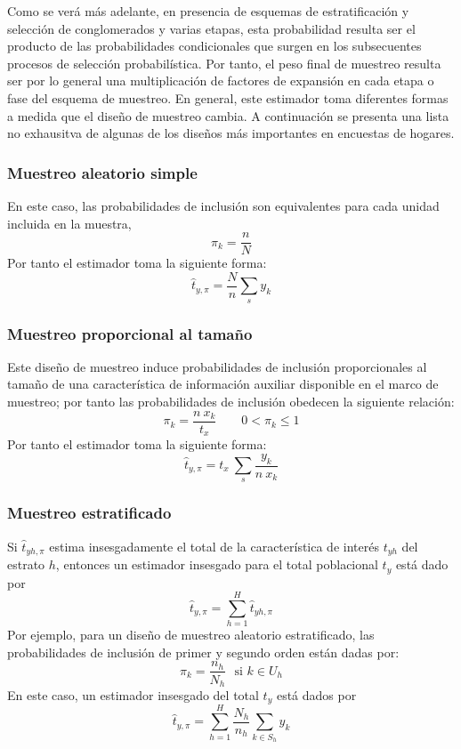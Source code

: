 \documentclass[
  10pt,
  spanish,
]{book}
\begin{document}
Como se verá más adelante, en presencia de esquemas de estratificación y selección de conglomerados y varias etapas, esta probabilidad resulta ser el producto de las probabilidades condicionales que surgen en los subsecuentes procesos de selección probabilística. Por tanto, el peso final de muestreo resulta ser por lo general una multiplicación de factores de expansión en cada etapa o fase del esquema de muestreo. En general, este estimador toma diferentes formas a medida que el diseño de muestreo cambia. A continuación se presenta una lista no exhausitva de algunas de los diseños más importantes en encuestas de hogares.

\hypertarget{muestreo-aleatorio-simple-1}{%
\subsubsection*{Muestreo aleatorio simple}\label{muestreo-aleatorio-simple-1}}

En este caso, las probabilidades de inclusión son equivalentes para cada unidad incluida en la muestra,
\[
\pi_k =\frac{n}{N}
\]
Por tanto el estimador toma la siguiente forma:
\[
\hat{t}_{y,\pi}=\frac{N}{n}\sum_sy_k
\]

\hypertarget{muestreo-proporcional-al-tamauxf1o-1}{%
\subsubsection*{Muestreo proporcional al tamaño}\label{muestreo-proporcional-al-tamauxf1o-1}}

Este diseño de muestreo induce probabilidades de inclusión proporcionales al tamaño de una característica de información auxiliar disponible en el marco de muestreo; por tanto las probabilidades de inclusión obedecen la siguiente relación:
\[
\pi_k=\frac{n\ x_k}{t_x} \ \ \ \ \ \ \ \ \ 0<\pi_k\leq 1
\]
Por tanto el estimador toma la siguiente forma:
\[
\hat{t}_{y,\pi}=t_x \ \sum_s\frac{y_k}{n\ x_k}
\]

\hypertarget{muestreo-estratificado-1}{%
\subsubsection*{Muestreo estratificado}\label{muestreo-estratificado-1}}

Si \(\hat{t}_{yh,\pi}\) estima insesgadamente el total de la característica de interés \(t_{yh}\) del estrato \(h\), entonces un estimador insesgado para el total poblacional \(t_y\) está dado por
\[
\hat{t}_{y,\pi}=\sum_{h=1}^H \hat{t}_{yh,\pi}
\]
Por ejemplo, para un diseño de muestreo aleatorio estratificado, las probabilidades de inclusión de primer y segundo orden están dadas por:
\[
  \pi_k = \dfrac{n_h}{N_h} \ \ \ \text{si $k\in U_h$}
\]
En este caso, un estimador insesgado del total \(t_{y}\) está dados por
\[
\hat{t}_{y,\pi}=\sum_{h=1}^H\dfrac{N_h}{n_h}\sum_{k\in S_h}y_k
\]
\end{document}
